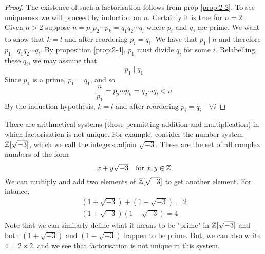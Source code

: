 \documentclass{article}
\begin{document}
\begin{proof}
    The existence of such a factorisation follows from prop \ref{prop:2-2}. To see uniqueness we will proceed by induction on $n$.
    Certainly it is true for $n=2$. Given $n > 2$ suppose $n = p_1p_2\cdots p_k = q_1q_2\cdots q_l$ where $p_i$ and $q_j$ are prime. We want to show that $k = l$ and after reordering $p_i = q_i$.
    We have that $p_1 \mid n$ and therefore $p_1 \mid q_1q_2\cdots q_l$. By proposition \ref{prop:2-4}, $p_1$ must divide $q_i$ for some $i$. Relabelling, these $q_i$, we may assume that
    \[
        p_1 \mid q_1 
    \]
    Since $p_1$ is a prime, $p_1 = q_1$, and so 
    \[
        \frac{n}{p_1} = p_2\cdots p_k = q_2\cdots q_l < n  
    \]
    By the induction hypothesis, $k = l$ and after reordering $p_i = q_i \quad \forall i$
\end{proof}


\begin{remark}
    There are arithmetical systems (those permitting addition and multiplication) in which factorisation is not unique. 
    For example, consider the number system $\mathbb{Z}[\sqrt{-3}]$, which we call the integers adjoin $\sqrt{-3}$. These are the set of all complex numbers of the form
    \[
        x + y\sqrt{-3} \quad \text{for} \ x, y \in \mathbb{Z} 
    \]
    We can multiply and add two elements of $\mathbb{Z}[\sqrt{-3}]$ to get another element. For intance,
    \begin{align*}
        (1 + \sqrt{-3}) + (1 - \sqrt{-3}) = 2 \\
        (1 + \sqrt{-3})(1 - \sqrt{-3}) = 4
    \end{align*}
    Note that we can similarly define what it means to be "prime" in $\mathbb{Z}[\sqrt{-3}]$ and both $(1 + \sqrt{-3})$ and $(1 - \sqrt{-3})$ happen to be prime. 
    But, we can also write $4 = 2 \times 2$, and we see that factorisation is not unique in this system. 
\end{remark}
    
\end{document}
